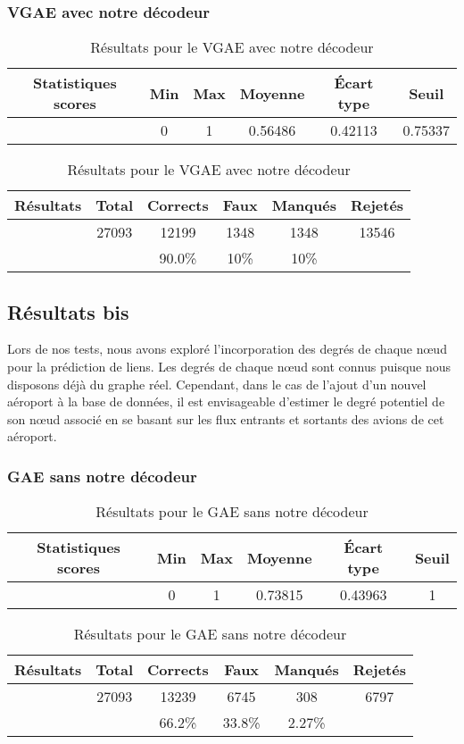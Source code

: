 \documentclass{article}
\begin{document}
\subsubsection{VGAE avec notre décodeur}

\begin{table}
    \centering
    \begin{tabular}{|c|c|c|c|c|c|}
        \hline
        Statistiques scores & Min & Max & Moyenne & Écart type & Seuil\\
        \hline
         & 0 & 1 & 0.56486 & 0.42113 & 0.75337 \\
         \hline
    \end{tabular}
    \begin{tabular}{|c|c|c|c|c|c|}
        \hline
        Résultats & Total & Corrects & Faux & Manqués & Rejetés\\
        \hline
         & 27093 & 12199 & 1348 & 1348 & 13546\\
        \hline
         &  & 90.0\% & 10\% & 10\% & \\
        \hline
    \end{tabular}
    \caption{Résultats pour le VGAE avec notre décodeur}
    \label{tab:my_label}
\end{table}

\subsection{Résultats bis}
Lors de nos tests, nous avons exploré l'incorporation des degrés de chaque nœud pour la prédiction de liens. Les degrés de chaque nœud sont connus puisque nous disposons déjà du graphe réel. Cependant, dans le cas de l'ajout d'un nouvel aéroport à la base de données, il est envisageable d'estimer le degré potentiel de son nœud associé en se basant sur les flux entrants et sortants des avions de cet aéroport.

\subsubsection{GAE sans notre décodeur}

\begin{table}
    \centering
    \begin{tabular}{|c|c|c|c|c|c|}
        \hline
        Statistiques scores & Min & Max & Moyenne & Écart type & Seuil\\
        \hline
         & 0 & 1 & 0.73815 & 0.43963 & 1 \\
         \hline
    \end{tabular}
    \begin{tabular}{|c|c|c|c|c|c|}
        \hline
        Résultats & Total & Corrects & Faux & Manqués & Rejetés\\
        \hline
         & 27093 & 13239 & 6745 & 308 & 6797\\
        \hline
         &  & 66.2\% & 33.8\% & 2.27\% & \\
        \hline
    \end{tabular}
    \caption{Résultats pour le GAE sans notre décodeur}
    \label{tab:my_label}
\end{table}
\end{document}

